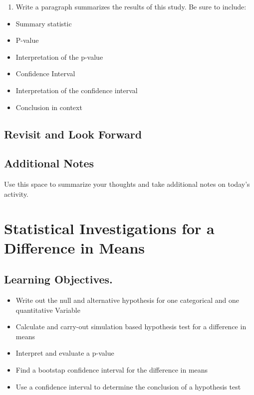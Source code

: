 \documentclass[
]{report}
\providecommand{\tightlist}{%
  \setlength{\itemsep}{0pt}\setlength{\parskip}{0pt}}
\begin{document}
\vspace{1in}

\begin{enumerate}
\def\labelenumi{\arabic{enumi}.}
\setcounter{enumi}{18}
\tightlist
\item
  Write a paragraph summarizes the results of this study. Be sure to include:
\end{enumerate}

\begin{itemize}
\item
  Summary statistic
\item
  P-value
\item
  Interpretation of the p-value
\item
  Confidence Interval
\item
  Interpretation of the confidence interval
\item
  Conclusion in context
\end{itemize}

\vspace{3in}

\hypertarget{revisit-and-look-forward}{%
\section{Revisit and Look Forward}\label{revisit-and-look-forward}}

\hypertarget{additional-notes}{%
\section{Additional Notes}\label{additional-notes}}

Use this space to summarize your thoughts and take additional notes on today's activity.

\hypertarget{statistical-investigations-for-a-difference-in-means}{%
\chapter{Statistical Investigations for a Difference in Means}\label{statistical-investigations-for-a-difference-in-means}}

\hypertarget{learning-objectives.}{%
\section{Learning Objectives.}\label{learning-objectives.}}

\begin{itemize}
\item
  Write out the null and alternative hypothesis for one categorical and one quantitative Variable
\item
  Calculate and carry-out simulation based hypothesis test for a difference in means
\item
  Interpret and evaluate a p-value
\item
  Find a bootstap confidence interval for the difference in means
\item
  Use a confidence interval to determine the conclusion of a hypothesis test
\end{itemize}
\end{document}
